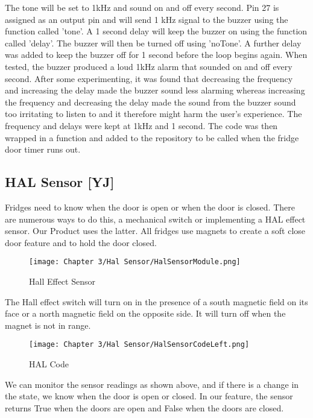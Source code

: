 The tone will be set to 1kHz and sound on and off every second.
Pin 27 is assigned as an output pin and will send 1 kHz signal to the buzzer using the function called 'tone'.
A 1 second delay will keep the buzzer on using the function called 'delay'.
The buzzer will then be turned off using 'noTone'.
A further delay was added to keep the buzzer off for 1 second before the loop begins again.
When tested, the buzzer produced a loud 1kHz alarm that sounded on and off every second.
After some experimenting, it was found that decreasing the frequency and increasing the delay made the buzzer sound less alarming whereas increasing the frequency and decreasing the delay made the sound from the buzzer sound too irritating to listen to and it therefore might harm the user's experience.
The frequency and delays were kept at 1kHz and 1 second.
The code was then wrapped in a function and added to the repository to be called when the fridge door timer runs out.


\subsection{HAL Sensor [YJ]}

Fridges need to know when the door is open or when the door is closed.
There are numerous ways to do this, a mechanical switch or implementing a HAL effect sensor.
Our Product uses the latter.
All fridges use magnets to create a soft close door feature and to hold the door closed.

\begin{figure}[H]        
    \centering
    \texttt{[image: Chapter 3/Hal Sensor/HalSensorModule.png]}
    \caption{Hall Effect Sensor}
    \label{fig:hallsens}
\end{figure} 

The Hall effect switch will turn on in the presence of a south magnetic field on its face or a north magnetic field on the opposite side.
It will turn off when the magnet is not in range.

\begin{figure}[H]        
    \centering
    \texttt{[image: Chapter 3/Hal Sensor/HalSensorCodeLeft.png]}
    \caption{HAL Code}
    \label{fig:halcode}
\end{figure} 

We can monitor the sensor readings as shown above, and if there is a change in the state, we know when the door is open or closed.
In our feature, the sensor returns True when the doors are open and False when the doors are closed.

